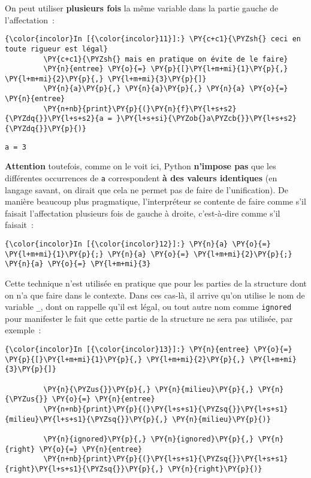     On peut utiliser \textbf{plusieurs fois} la même variable dans la partie
gauche de l'affectation~:

    \begin{Verbatim}[commandchars=\\\{\}]
{\color{incolor}In [{\color{incolor}11}]:} \PY{c+c1}{\PYZsh{} ceci en toute rigueur est légal}
         \PY{c+c1}{\PYZsh{} mais en pratique on évite de le faire}
         \PY{n}{entree} \PY{o}{=} \PY{p}{[}\PY{l+m+mi}{1}\PY{p}{,} \PY{l+m+mi}{2}\PY{p}{,} \PY{l+m+mi}{3}\PY{p}{]}
         \PY{n}{a}\PY{p}{,} \PY{n}{a}\PY{p}{,} \PY{n}{a} \PY{o}{=} \PY{n}{entree}
         \PY{n+nb}{print}\PY{p}{(}\PY{n}{f}\PY{l+s+s2}{\PYZdq{}}\PY{l+s+s2}{a = }\PY{l+s+si}{\PYZob{}a\PYZcb{}}\PY{l+s+s2}{\PYZdq{}}\PY{p}{)}
\end{Verbatim}


    \begin{Verbatim}[commandchars=\\\{\}]
a = 3

    \end{Verbatim}

    \textbf{Attention} toutefois, comme on le voit ici, Python
\textbf{n'impose pas} que les différentes occurrences de \texttt{a}
correspondent \textbf{à des valeurs identiques} (en langage savant, on
dirait que cela ne permet pas de faire de l'unification). De manière
beaucoup plus pragmatique, l'interpréteur se contente de faire comme
s'il faisait l'affectation plusieurs fois de gauche à droite,
c'est-à-dire comme s'il faisait~:

    \begin{Verbatim}[commandchars=\\\{\}]
{\color{incolor}In [{\color{incolor}12}]:} \PY{n}{a} \PY{o}{=} \PY{l+m+mi}{1}\PY{p}{;} \PY{n}{a} \PY{o}{=} \PY{l+m+mi}{2}\PY{p}{;} \PY{n}{a} \PY{o}{=} \PY{l+m+mi}{3}
\end{Verbatim}


    Cette technique n'est utilisée en pratique que pour les parties de la
structure dont on n'a que faire dans le contexte. Dans ces cas-là, il
arrive qu'on utilise le nom de variable \texttt{\_}, dont on rappelle
qu'il est légal, ou tout autre nom comme \texttt{ignored} pour
manifester le fait que cette partie de la structure ne sera pas
utilisée, par exemple~:

    \begin{Verbatim}[commandchars=\\\{\}]
{\color{incolor}In [{\color{incolor}13}]:} \PY{n}{entree} \PY{o}{=} \PY{p}{[}\PY{l+m+mi}{1}\PY{p}{,} \PY{l+m+mi}{2}\PY{p}{,} \PY{l+m+mi}{3}\PY{p}{]}
         
         \PY{n}{\PYZus{}}\PY{p}{,} \PY{n}{milieu}\PY{p}{,} \PY{n}{\PYZus{}} \PY{o}{=} \PY{n}{entree}
         \PY{n+nb}{print}\PY{p}{(}\PY{l+s+s1}{\PYZsq{}}\PY{l+s+s1}{milieu}\PY{l+s+s1}{\PYZsq{}}\PY{p}{,} \PY{n}{milieu}\PY{p}{)}
         
         \PY{n}{ignored}\PY{p}{,} \PY{n}{ignored}\PY{p}{,} \PY{n}{right} \PY{o}{=} \PY{n}{entree}
         \PY{n+nb}{print}\PY{p}{(}\PY{l+s+s1}{\PYZsq{}}\PY{l+s+s1}{right}\PY{l+s+s1}{\PYZsq{}}\PY{p}{,} \PY{n}{right}\PY{p}{)}
\end{Verbatim}


